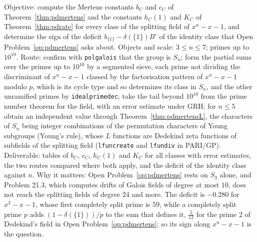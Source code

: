 \begin{compproblem}\label{cp:pdsn}
Objective: compute the Mertens constants $b_C$ and $c_C$ of Theorem~\ref{thm:pdmertens} and the constants $h_C(1)$ and $K_C$ of Theorem~\ref{thm:pdrate} for every class of the splitting field of $x^n-x-1$, and determine the sign of the deficit $b_{\{1\}}-\delta(\{1\})B'$ of the identity class that Open Problem~\ref{op:pdmertens} asks about. Objects and scale: $3\le n\le7$; primes up to $10^{10}$. Route: confirm with \texttt{polgalois} that the group is $S_n$; form the partial sums over the primes up to $10^{10}$ by a segmented sieve, each prime not dividing the discriminant of $x^n-x-1$ classed by the factorisation pattern of $x^n-x-1$ modulo $p$, which is its cycle type and so determines its class in $S_n$, and the other unramified primes by \texttt{idealprimedec}; take the tail beyond $10^{10}$ from the prime number theorem for the field, with an error estimate under GRH; for $n\le5$ obtain an independent value through Theorem~\ref{thm:pdmertensL}, the characters of $S_n$ being integer combinations of the permutation characters of Young subgroups (Young's rule), whose $L$ functions are Dedekind zeta functions of subfields of the splitting field (\texttt{lfuncreate} and \texttt{lfundiv} in PARI/GP). Deliverable: tables of $b_C$, $c_C$, $h_C(1)$ and $K_C$ for all classes with error estimates, the two routes compared where both apply, and the deficit of the identity class against $n$. Why it matters: Open Problem~\ref{op:pdmertens} rests on $S_3$ alone, and Problem 21.3, which computes drifts of Galois fields of degree at most $10$, does not reach the splitting fields of degree $24$ and more. The deficit is $-0.280$ for $x^3-x-1$, whose first completely split prime is $59$, while a completely split prime $p$ adds $(1-\delta(\{1\}))/p$ to the sum that defines it, $\frac5{12}$ for the prime $2$ of Dedekind's field in Open Problem~\ref{op:pdmertens}; so its sign along $x^n-x-1$ is the question.
\end{compproblem}

